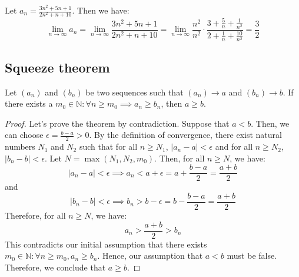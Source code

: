 \begin{eg}
    Let $a_n = \frac{3n^2 + 5n + 1}{2n^2 + n + 10}$. Then we have:
    \[
        \lim_{n \to \infty} a_n = \lim_{n \to \infty} \frac{3n^2 + 5n + 1}{2n^2 + n + 10} = \lim_{n \to \infty} \frac{n^2}{n^2} \cdot \frac{3 + \frac{5}{n} + \frac{1}{n^2}}{2 + \frac{1}{n} + \frac{10}{n^2}} = \frac{3}{2}
    \]
\end{eg}

\subsection{Squeeze theorem}
\begin{theorem}
    Let $(a_n)$ and $(b_n)$ be two sequences such that $(a_n) \to a$ and $(b_n) \to b$. If there exists a $m_0 \in \mathbb{N} : \forall n \geq m_0 \implies a_n \geq b_n$, then \( a \geq b \).
\end{theorem}
\begin{proof}
    Let's prove the theorem by contradiction. Suppose that \( a < b \). Then, we can choose \( \epsilon = \frac{b - a}{2} > 0 \). By the definition of convergence, there exist natural numbers \( N_1 \) and \( N_2 \) such that for all \( n \geq N_1 \), \( |a_n - a| < \epsilon \) and for all \( n \geq N_2 \), \( |b_n - b| < \epsilon \).
    Let \( N = \max(N_1, N_2, m_0) \). Then, for all \( n \geq N \), we have:
    \[
        |a_n - a| < \epsilon \implies a_n < a + \epsilon = a + \frac{b - a}{2} = \frac{a + b}{2}
    \]
    and
    \[
        |b_n - b| < \epsilon \implies b_n > b - \epsilon = b - \frac{b - a}{2} = \frac{a + b}{2}
    \]
    Therefore, for all \( n \geq N \), we have:
    \[
        a_n > \frac{a + b}{2} > b_n
    \]
    This contradicts our initial assumption that there exists \( m_0 \in \mathbb{N} : \forall n \geq m_0, a_n \geq b_n \). Hence, our assumption that \( a < b \) must be false. Therefore, we conclude that \( a \geq b \).
\end{proof}

